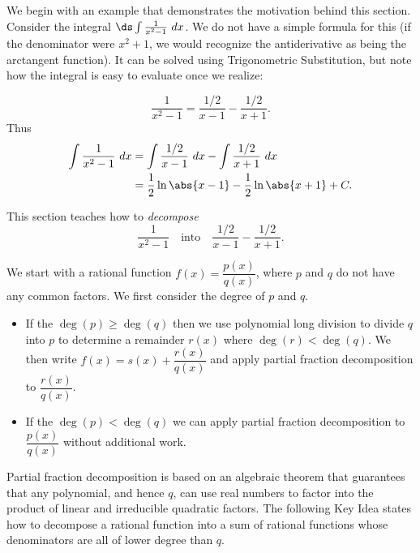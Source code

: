 We begin with an example that demonstrates the motivation behind this section. Consider the integral $\ds\int \frac{1}{x^2-1}\ dx$. We do not have a simple formula for this (if the denominator were $x^2+1$, we would recognize the antiderivative as being the arctangent function). It can be solved using Trigonometric Substitution, but note how the integral is easy to evaluate once we realize:

\[\frac{1}{x^2-1} = \frac{1/2}{x-1} - \frac{1/2}{x+1}.\]
Thus 
\begin{align*}
\int\frac{1}{x^2-1}\ dx &= \int\frac{1/2}{x-1}\ dx - \int\frac{1/2}{x+1}\ dx \\
			&= \frac12\ln\abs{x-1}-\frac12\ln\abs{x+1}+C.
\end{align*}

This section teaches how to \emph{decompose}
\[\frac1{x^2-1}\quad  \text{into}\quad  \frac{1/2}{x-1}-\frac{1/2}{x+1}.\]

We start with a rational function $f(x)=\dfrac{p(x)}{q(x)}$, where $p$ and $q$ do not have any common factors. We first consider the degree of $p$ and $q$. 
\begin{itemize}
	\item If the $\deg(p)\ge\deg(q)$ then we use polynomial long division to divide $q$ into $p$ to determine a remainder $r(x)$ where $\deg(r)<\deg(q)$. We then write $f(x) =s(x)+\dfrac{r(x)}{q(x)}$ and apply partial fraction decomposition to $\dfrac{r(x)}{q(x)}$.
	\item If the $\deg(p)<\deg(q)$ we can apply partial fraction decomposition to $\dfrac{p(x)}{q(x)}$ without additional work.
\end{itemize}

Partial fraction decomposition is based on an algebraic theorem that guarantees that any polynomial, and hence $q$, can use real numbers to factor into the product of linear and irreducible quadratic factors.
The following Key Idea states how to decompose a rational function into a sum of rational functions whose denominators are all of lower degree than $q$.

